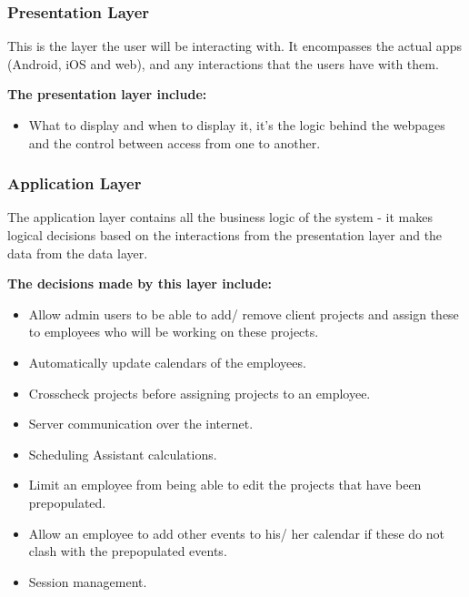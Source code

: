 \documentclass[a4paper,12pt]{article}
\begin{document}
  
  \subsubsection{Presentation Layer}
    \begin{paragraph}
       This is the layer the user will be interacting with. It encompasses the actual apps (Android, iOS and web), and any interactions that the users have with them.     
    \end{paragraph}
    \textbf{The presentation layer include:  }
      \begin{itemize}
        \item What to display and when to display it, it’s the logic behind the webpages and the control between access from one to another.
      \end{itemize}
  
  \subsubsection{Application Layer}
    \begin{paragraph}
        The application layer contains all the business logic of the system - it makes logical decisions based on the interactions from the presentation layer and the data from the data layer.    
    \end{paragraph}

    \textbf{The decisions made by this layer include:}
          \begin{itemize}
            \item Allow admin users to be able to add/ remove client projects and assign these to employees who will be working on these projects.
            \item Automatically update calendars of the employees.
            \item Crosscheck projects before assigning projects to an employee.
            \item Server communication over the internet.
            \item Scheduling Assistant calculations. 
            \item Limit an employee from being able to edit the projects that have been prepopulated.
            \item Allow an employee  to add other events to his/ her calendar if these do not clash with the prepopulated events.
            \item Session management.
          \end{itemize}
  
\end{document}
